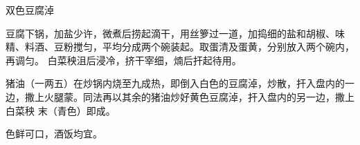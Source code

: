 \begin{recipe}[鸳鸯豆腐淖]{双色豆腐淖}

\ingredients


\preparation

\step 豆腐下锅，加盐少许，微煮后捞起滴干，用丝箩过一道，加捣细的盐和胡椒、味
精、料酒、豆粉搅匀，平均分成两个碗装起。取蛋清及蛋黄，分别放入两个碗内，再调匀。
白菜秧沮后浸冷，挤干宰细，煵后扞起待用。

\step 猪油（一两五）在炒锅内烧至九成热，即倒入白色的豆腐淖，炒散，扞入盘内的一
边，撒上火腿蒙。同法再以其余的猪油炒好黄色豆腐淖，扞入盘内的另一边，撒上白菜秧
末（青色）即成。

\features

色鲜可口，酒饭均宜。

\end{recipe}

